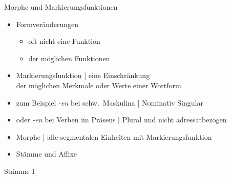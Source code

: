 \begin{frame}
  {Morphe und Markierungsfunktionen}
  \pause
  \begin{itemize}[<+->]
    \item Formveränderungen
      \begin{itemize}[<+->]
        \item oft nicht \alert{eine} Funktion
        \item {} der möglichen Funktionen
      \end{itemize}
   \Halbzeile 
    \item \alert{Markierungsfunktion} | eine \alert{Einschränkung}\\
      der möglichen Merkmale oder Werte einer Wortform
    \item zum Beispiel \textit{-en} bei schw.\ Maskulina |  Nominativ Singular
    \item oder \textit{-en} bei Verben im Präsens | Plural und nicht adressatbezogen
      \Halbzeile
    \item \alert{Morphe | alle segmentalen Einheiten mit Markierungsfunktion}
    \item \alert{Stämme} und \alert{Affixe}
  \end{itemize}
\end{frame}

\begin{frame}
  {Stämme I}
  \pause
  \begin{exe}
    \ex
    \begin{xlist}
        \pause
        \pause
    \end{xlist}
  \end{exe}
\end{frame}

